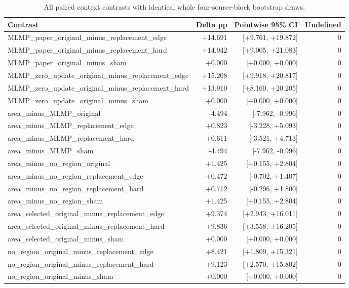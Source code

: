 \begin{table}[htbp]
\centering\scriptsize
\caption{All paired context contrasts with identical whole four-source-block bootstrap draws.}
\label{tab:context-ci}
\setlength{\tabcolsep}{4pt}
\begin{tabular}{lrrr}
\toprule
Contrast & Delta pp & Pointwise 95\% CI & Undefined \\
\midrule
MLMP\_paper\_original\_minus\_replacement\_edge & +14.691 & [+9.761, +19.872] & 0 \\
MLMP\_paper\_original\_minus\_replacement\_hard & +14.942 & [+9.005, +21.083] & 0 \\
MLMP\_paper\_original\_minus\_sham & +0.000 & [+0.000, +0.000] & 0 \\
MLMP\_zero\_update\_original\_minus\_replacement\_edge & +15.208 & [+9.918, +20.817] & 0 \\
MLMP\_zero\_update\_original\_minus\_replacement\_hard & +13.910 & [+8.160, +20.205] & 0 \\
MLMP\_zero\_update\_original\_minus\_sham & +0.000 & [+0.000, +0.000] & 0 \\
area\_minus\_MLMP\_original & -4.494 & [-7.962, -0.996] & 0 \\
area\_minus\_MLMP\_replacement\_edge & +0.823 & [-3.228, +5.093] & 0 \\
area\_minus\_MLMP\_replacement\_hard & +0.611 & [-3.521, +4.713] & 0 \\
area\_minus\_MLMP\_sham & -4.494 & [-7.962, -0.996] & 0 \\
area\_minus\_no\_region\_original & +1.425 & [+0.155, +2.804] & 0 \\
area\_minus\_no\_region\_replacement\_edge & +0.472 & [-0.702, +1.407] & 0 \\
area\_minus\_no\_region\_replacement\_hard & +0.712 & [-0.296, +1.800] & 0 \\
area\_minus\_no\_region\_sham & +1.425 & [+0.155, +2.804] & 0 \\
area\_selected\_original\_minus\_replacement\_edge & +9.374 & [+2.943, +16.011] & 0 \\
area\_selected\_original\_minus\_replacement\_hard & +9.836 & [+3.558, +16.205] & 0 \\
area\_selected\_original\_minus\_sham & +0.000 & [+0.000, +0.000] & 0 \\
no\_region\_original\_minus\_replacement\_edge & +8.421 & [+1.809, +15.321] & 0 \\
no\_region\_original\_minus\_replacement\_hard & +9.123 & [+2.570, +15.802] & 0 \\
no\_region\_original\_minus\_sham & +0.000 & [+0.000, +0.000] & 0 \\
\bottomrule
\end{tabular}
\end{table}

